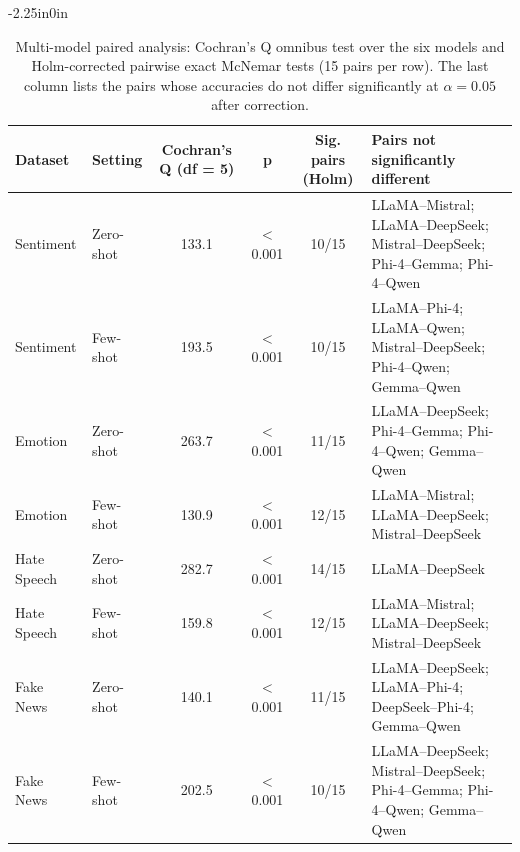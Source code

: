 \documentclass[10pt,letterpaper]{article}
\begin{document}
\begin{table}[!t]
\begin{adjustwidth}{-2.25in}{0in}
\centering
\small
\caption{Multi-model paired analysis: Cochran's Q omnibus test over the six models and Holm-corrected pairwise exact McNemar tests (15 pairs per row). The last column lists the pairs whose accuracies do not differ significantly at $\alpha = 0.05$ after correction.}
\label{tab:cochran}
\renewcommand{\arraystretch}{1.1}
\setlength{\tabcolsep}{5pt}
\begin{tabular}{|l|l|c|c|c|p{7.2cm}|}
\hline
\textbf{Dataset} & \textbf{Setting} & \textbf{Cochran's Q (df = 5)} & \textbf{p} & \textbf{Sig. pairs (Holm)} & \textbf{Pairs not significantly different} \\ 
\hline
Sentiment & Zero-shot & 133.1 & $<$0.001 & 10/15 & LLaMA--Mistral; LLaMA--DeepSeek; Mistral--DeepSeek; Phi-4--Gemma; Phi-4--Qwen \\ 
Sentiment & Few-shot & 193.5 & $<$0.001 & 10/15 & LLaMA--Phi-4; LLaMA--Qwen; Mistral--DeepSeek; Phi-4--Qwen; Gemma--Qwen \\ 
\hline
Emotion & Zero-shot & 263.7 & $<$0.001 & 11/15 & LLaMA--DeepSeek; Phi-4--Gemma; Phi-4--Qwen; Gemma--Qwen \\ 
Emotion & Few-shot & 130.9 & $<$0.001 & 12/15 & LLaMA--Mistral; LLaMA--DeepSeek; Mistral--DeepSeek \\ 
\hline
Hate Speech & Zero-shot & 282.7 & $<$0.001 & 14/15 & LLaMA--DeepSeek \\ 
Hate Speech & Few-shot & 159.8 & $<$0.001 & 12/15 & LLaMA--Mistral; LLaMA--DeepSeek; Mistral--DeepSeek \\ 
\hline
Fake News & Zero-shot & 140.1 & $<$0.001 & 11/15 & LLaMA--DeepSeek; LLaMA--Phi-4; DeepSeek--Phi-4; Gemma--Qwen \\ 
Fake News & Few-shot & 202.5 & $<$0.001 & 10/15 & LLaMA--DeepSeek; Mistral--DeepSeek; Phi-4--Gemma; Phi-4--Qwen; Gemma--Qwen \\ 
\hline
\end{tabular}
\end{adjustwidth}
\end{table}
\end{document}
